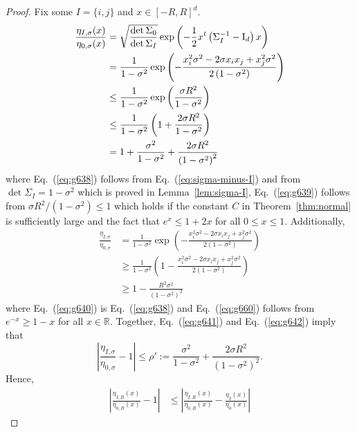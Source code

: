 \documentclass[final, 12pt]{colt2018}
\renewcommand{\eqref}[1]{Eq.~(\ref{#1})}
\begin{document}
\begin{proof}
Fix some $I = \{ i,j \}$ and $x \in [-R,R]^d$.
\begin{align}
\frac{\eta_{I,\sigma}(x)}{\eta_{0,\sigma}(x)}
&= \sqrt{\frac{\det \Sigma_0}{\det \Sigma_I}} \exp\left( -\frac{1}{2} x^t \left(\Sigma_I^{-1} - \mathrm{I}_d\right) x\right) \notag \\
&= \frac{1}{1-\sigma^2} \exp\left( -\frac{x_i^2 \sigma^2 - 2 \sigma x_i x_j + x_j^2 \sigma^2}{2\left(1-\sigma^2\right)} \right) \label{eq:g638} \\
&\le \frac{1}{1-\sigma^2} \exp\left(\frac{\sigma R^2}{1-\sigma^2} \right) \notag \\
&\le \frac{1}{1-\sigma^2} \left(1 + \frac{2\sigma R^2}{1-\sigma^2} \right) \label{eq:g639} \\
&= 1 + \frac{\sigma^2}{1-\sigma^2} + \frac{2\sigma R^2}{\left(1-\sigma^2\right)^2} \label{eq:g641}
\end{align}
where \eqref{eq:g638} follows from \eqref{eq:sigma-minus-I} and from $\det \Sigma_I = 1 - \sigma^2$ which is proved in Lemma~\ref{lem:sigma-I}, \eqref{eq:g639} follows from $\sigma R^2 /\left(1-\sigma^2\right) \le 1$ which holds if the constant $C$ in Theorem~\ref{thm:normal} is sufficiently large and the fact that $e^x \le 1 + 2x$ for all $0 \le x \le 1$. Additionally, 
\begin{align}
\frac{\eta_{I,\sigma}}{\eta_{0,\sigma}}
&= \frac{1}{1-\sigma^2} \exp\left( -\frac{x_i^2 \sigma^2 - 2 \sigma x_i x_j + x_j^2 \sigma^2}{2\left(1-\sigma^2\right)} \right) \label{eq:g640} \\
&\ge \frac{1}{1-\sigma^2} \left(1 -\frac{x_i^2 \sigma^2 - 2 \sigma x_i x_j + x_j^2 \sigma^2}{2\left(1-\sigma^2\right)} \right) \label{eq:g660} \\
&\ge 1 -\frac{R^2 \sigma^2}{\left(1-\sigma^2\right)^2} \label{eq:g642}
\end{align}
where \eqref{eq:g640} is \eqref{eq:g638} and \eqref{eq:g660} follows from $e^{-x} \ge 1-x$ for all $x \in \mathbb{R}$. Together, \eqref{eq:g641} and \eqref{eq:g642} imply that
\begin{equation} \label{eq:g643}
\left\lvert \frac{\eta_{I,\sigma}}{\eta_{0,\sigma}} - 1 \right\rvert 
\le \rho'
:= \frac{\sigma^2}{1-\sigma^2} + \frac{2\sigma R^2}{\left(1-\sigma^2\right)^2}.
\end{equation}
Hence,
\begin{align} \label{eq:g-rho}
\left \lvert \frac{\eta_{I,R}(x)}{\eta_{0,R}(x)} - 1 \right\rvert
&\le \left \lvert \frac{\eta_{I,R}(x)}{\eta_{0,R}(x)} - \frac{\eta_I(x)}{\eta_0(x)} \right\rvert

\end{align}
\end{proof}
\end{document}
